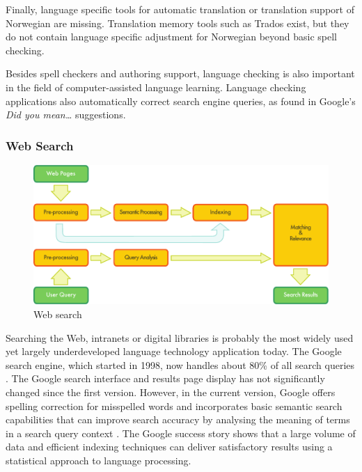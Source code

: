 \begin{multicols}{2}
Finally, language specific tools for automatic translation or translation support of Norwegian are missing. Translation memory tools such as Trados exist, but they do not contain language specific adjustment for Norwegian beyond basic spell checking.

Besides spell checkers and authoring support, language checking is also important in the field of computer-assisted language learning. Language checking applications also automatically correct search engine queries, as found in Google's \textit{Did you mean…} suggestions.

\subsubsection{Web Search}

\begin{figure}[htb]
  \center
  \includegraphics[width=\textwidth]{../_media/english/web_search_architecture}
  \caption{Web search}
  \label{fig:websearcharch_en}
 \end{figure}

Searching the Web, intranets or digital libraries is probably the most widely used yet largely underdeveloped language technology application today. The Google search engine, which started in 1998, now handles about 80\% of all search queries \cite{spi1}. 
The Google search interface and results page display has not significantly changed since the first version. However, in the current version, Google offers spelling correction for misspelled words and incorporates basic semantic search capabilities that can improve search accuracy by analysing the meaning of terms in a search query context \cite{pc1}. The Google success story shows that a large volume of data and efficient indexing techniques can deliver satisfactory results using a statistical approach to language processing. 


\end{multicols}
